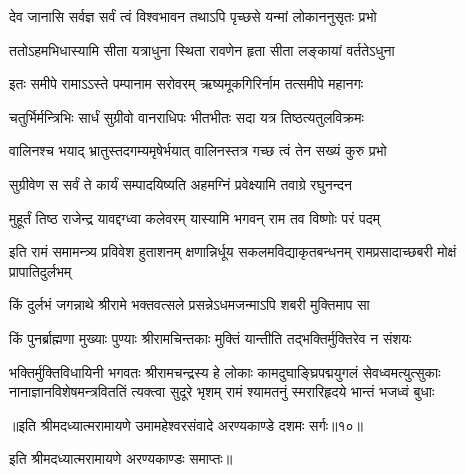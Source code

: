 
\twolineshloka
{देव जानासि सर्वज्ञ सर्वं त्वं विश्वभावन}
{तथाऽपि पृच्छसे यन्मां लोकाननुसृतः प्रभो} %

\twolineshloka
{ततोऽहमभिधास्यामि सीता यत्राधुना स्थिता}
{रावणेन हृता सीता लङ्कायां वर्ततेऽधुना} %

\twolineshloka
{इतः समीपे रामाऽऽस्ते पम्पानाम सरोवरम्}
{ऋष्यमूकगिरिर्नाम तत्समीपे महानगः} %

\twolineshloka
{चतुर्भिर्मन्त्रिभिः सार्धं सुग्रीवो वानराधिपः}
{भीतभीतः सदा यत्र तिष्ठत्यतुलविक्रमः} %

\twolineshloka
{वालिनश्च भयाद् भ्रातुस्तदगम्यमृषेर्भयात्}
{वालिनस्तत्र गच्छ त्वं तेन सख्यं कुरु प्रभो} %

\twolineshloka
{सुग्रीवेण स सर्वं ते कार्यं सम्पादयिष्यति}
{अहमग्निं प्रवेक्ष्यामि तवाग्रे रघुनन्दन} %

\twolineshloka
{मुहूर्तं तिष्ठ राजेन्द्र यावद्दग्ध्वा कलेवरम्}
{यास्यामि भगवन् राम तव विष्णोः परं पदम्} %

\threelineshloka
{इति रामं समामन्त्र्य प्रविवेश हुताशनम्}
{क्षणान्निर्धूय सकलमविद्याकृतबन्धनम्}
{रामप्रसादाच्छबरी मोक्षं प्रापातिदुर्लभम्} %

\twolineshloka
{किं दुर्लभं जगन्नाथे श्रीरामे भक्तवत्सले}
{प्रसन्नेऽधमजन्माऽपि शबरी मुक्तिमाप सा} %

\twolineshloka
{किं पुनर्ब्राह्मणा मुख्याः पुण्याः श्रीरामचिन्तकाः}
{मुक्तिं यान्तीति तद्भक्तिर्मुक्तिरेव न संशयः} %

\fourlineindentedshloka
{भक्तिर्मुक्तिविधायिनी भगवतः श्रीरामचन्द्रस्य हे}
{लोकाः कामदुघाङ्घ्रिपद्मयुगलं सेवध्वमत्युत्सुकाः}
{नानाज्ञानविशेषमन्त्रविततिं त्यक्त्वा सुदूरे भृशम्}
{रामं श्यामतनुं स्मरारिहृदये भान्तं भजध्वं बुधाः} %

{॥इति श्रीमदध्यात्मरामायणे उमामहेश्वरसंवादे
अरण्यकाण्डे दशमः सर्गः॥१०॥
}

इति श्रीमदध्यात्मरामायणे अरण्यकाण्डः समाप्तः॥
